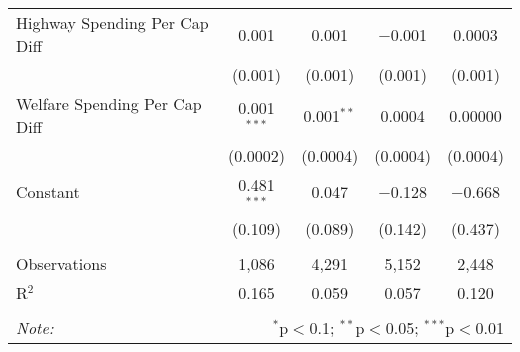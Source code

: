 \begin{table}[!htbp]
\begin{tabular}{@{\extracolsep{5pt}}lcccc}
  Highway Spending Per Cap Diff & 0.001 & 0.001 & $-$0.001 & 0.0003 \\ 
  & (0.001) & (0.001) & (0.001) & (0.001) \\ 
  Welfare Spending Per Cap Diff & 0.001$^{***}$ & 0.001$^{**}$ & 0.0004 & 0.00000 \\ 
  & (0.0002) & (0.0004) & (0.0004) & (0.0004) \\ 
  Constant & 0.481$^{***}$ & 0.047 & $-$0.128 & $-$0.668 \\ 
  & (0.109) & (0.089) & (0.142) & (0.437) \\ 
 \hline \\[-1.8ex] 
Observations & 1,086 & 4,291 & 5,152 & 2,448 \\ 
R$^{2}$ & 0.165 & 0.059 & 0.057 & 0.120 \\ 
\hline 
\hline \\[-1.8ex] 
\textit{Note:}  & \multicolumn{4}{r}{$^{*}$p$<$0.1; $^{**}$p$<$0.05; $^{***}$p$<$0.01} \\ 
\end{tabular} 
\end{table} 
